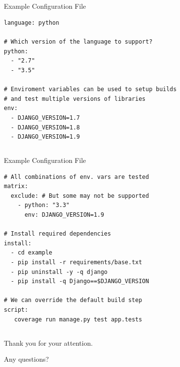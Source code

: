 \documentclass[xcolor=x11names,compress,t]{beamer}
\renewcommand{\(}{\begin{columns}[T]}
\renewcommand{\)}{\end{columns}}
\newcommand{\<}[1]{\begin{column}{#1}}
\renewcommand{\>}{\end{column}}
\newenvironment{slide}[1]{\subsection{#1} \begin{frame}{#1}}{\end{frame}}
\begin{document}
\subsection{}
\begin{frame}[fragile]{Example Configuration File}
\begin{verbatim}
language: python

# Which version of the language to support?
python:
  - "2.7"
  - "3.5"

# Enviroment variables can be used to setup builds
# and test multiple versions of libraries
env:
  - DJANGO_VERSION=1.7
  - DJANGO_VERSION=1.8
  - DJANGO_VERSION=1.9
\end{verbatim}
\end{frame}

\subsection{}
\begin{frame}[fragile]{Example Configuration File}
\begin{verbatim}
# All combinations of env. vars are tested
matrix:
  exclude: # But some may not be supported
    - python: "3.3"
      env: DJANGO_VERSION=1.9

# Install required dependencies
install:
  - cd example
  - pip install -r requirements/base.txt
  - pip uninstall -y -q django
  - pip install -q Django==$DJANGO_VERSION

# We can override the default build step
script:
   coverage run manage.py test app.tests
\end{verbatim}
\end{frame}

\begin{slide}{}
\vspace{5em}
\centering
\Large
Thank you for your attention.

\vspace{5em}

Any questions?
\end{slide}
\end{document}
